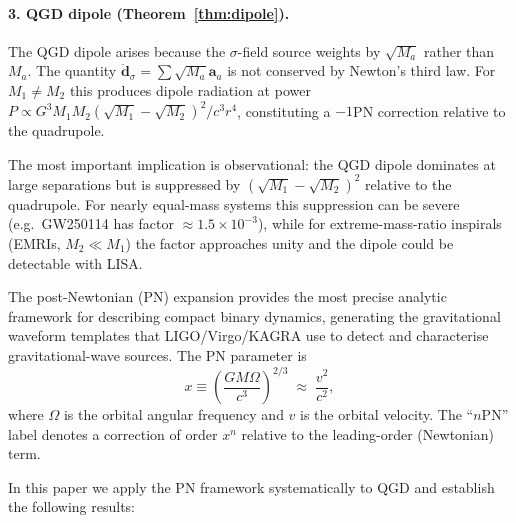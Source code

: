 \documentclass[11pt,a4paper]{article}
\theoremstyle{definition}
\theoremstyle{remark}
\newcommand{\bolda}{\mathbf{a}}
\begin{document}
	\paragraph{3. QGD dipole (Theorem~\ref{thm:dipole}).}
	The QGD dipole arises because the $\sigma$-field source weights by
	$\sqrt{M_a}$ rather than $M_a$.  The quantity
	$\ddot{\boldsymbol{d}}_\sigma=\sum\sqrt{M_a}\bolda_a$ is not
	conserved by Newton's third law.  For $M_1\neq M_2$ this produces
	dipole radiation at power $P\propto G^3M_1M_2(\sqrt{M_1}-\sqrt{M_2})^2/c^3r^4$,
	constituting a $-1$PN correction relative to the quadrupole.
	
	The most important implication is observational: the QGD dipole
	dominates at large separations but is suppressed by
	$(\sqrt{M_1}-\sqrt{M_2})^2$ relative to the quadrupole.  For
	nearly equal-mass systems this suppression can be severe (e.g.\
	GW250114 has factor $\approx1.5\times10^{-3}$), while for
	extreme-mass-ratio inspirals (EMRIs, $M_2\ll M_1$) the factor
	approaches unity and the dipole could be detectable with LISA.
	
	
	The post-Newtonian (PN) expansion provides the most precise analytic
	framework for describing compact binary dynamics, generating the
	gravitational waveform templates that LIGO/Virgo/KAGRA use to detect
	and characterise gravitational-wave sources.  The PN parameter is
	\begin{equation}
		x \equiv \left(\frac{GM\Omega}{c^3}\right)^{2/3}
		\;\approx\; \frac{v^2}{c^2},
		\label{eq:pn_param}
	\end{equation}
	where $\Omega$ is the orbital angular frequency and $v$ is the
	orbital velocity.  The ``$n$PN'' label denotes a correction of order
	$x^n$ relative to the leading-order (Newtonian) term.
	
	In this paper we apply the PN framework systematically to QGD and
	establish the following results:
	
\end{document}
